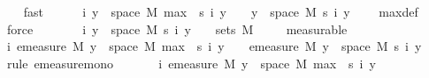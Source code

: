 \begin{isabellebody}
\ {\isacharasterisk}{\kern0pt}\ \isamarkupfalse%
\ fast\isanewline
\ \ \ \ \isamarkupfalse%
\ {\isachardoublequoteopen}{\isasymAnd}i{\isachardot}{\kern0pt}\ {\isacharbraceleft}{\kern0pt}y\ {\isasymin}\ space\ M{\isachardot}{\kern0pt}\ max\ {}\ {\isacharparenleft}{\kern0pt}s\ i\ y{\isacharparenright}{\kern0pt}\ {\isasymnoteq}\ {}{\isacharbraceright}{\kern0pt}\ {\isasymsubseteq}\ {\isacharbraceleft}{\kern0pt}y\ {\isasymin}\ space\ M{\isachardot}{\kern0pt}\ s\ i\ y\ {\isasymnoteq}\ {}{\isacharbraceright}{\kern0pt}{\isachardoublequoteclose}\ \isamarkupfalse%
\ max{\isacharunderscore}{\kern0pt}def\ \isamarkupfalse%
\ force\isanewline
\ \ \ \ \isamarkupfalse%
\ \isamarkupfalse%
\ {\isachardoublequoteopen}{\isasymAnd}i{\isachardot}{\kern0pt}\ {\isacharbraceleft}{\kern0pt}y\ {\isasymin}\ space\ M{\isachardot}{\kern0pt}\ s\ i\ y\ {\isasymnoteq}\ {}{\isacharbraceright}{\kern0pt}\ {\isasymin}\ sets\ M{\isachardoublequoteclose}\ \isamarkupfalse%
\ {\isacharasterisk}{\kern0pt}\ \isamarkupfalse%
\ measurable\isanewline
\ \ \ \ \isamarkupfalse%
\ \isamarkupfalse%
\ {\isachardoublequoteopen}{\isasymAnd}i{\isachardot}{\kern0pt}\ emeasure\ M\ {\isacharbraceleft}{\kern0pt}y\ {\isasymin}\ space\ M{\isachardot}{\kern0pt}\ max\ {}\ {\isacharparenleft}{\kern0pt}s\ i\ y{\isacharparenright}{\kern0pt}\ {\isasymnoteq}\ {}{\isacharbraceright}{\kern0pt}\ {\isasymle}\ emeasure\ M\ {\isacharbraceleft}{\kern0pt}y\ {\isasymin}\ space\ M{\isachardot}{\kern0pt}\ s\ i\ y\ {\isasymnoteq}\ {}{\isacharbraceright}{\kern0pt}{\isachardoublequoteclose}\ \isamarkupfalse%
\ {\isacharparenleft}{\kern0pt}rule\ emeasure{\isacharunderscore}{\kern0pt}mono{\isacharparenright}{\kern0pt}\ \isanewline
\ \ \ \ \isamarkupfalse%
\ {\isacharasterisk}{\kern0pt}{\isacharasterisk}{\kern0pt}{\isacharcolon}{\kern0pt}{\isachardoublequoteopen}{\isasymAnd}i{\isachardot}{\kern0pt}\ emeasure\ M\ {\isacharbraceleft}{\kern0pt}y\ {\isasymin}\ space\ M{\isachardot}{\kern0pt}\ max\ {}\ {\isacharparenleft}{\kern0pt}s\ i\ y{\isacharparenright}{\kern0pt}\ {\isasymnoteq}\ {}{\isacharbraceright}{\kern0pt}\ {\isasymnoteq}\ {\isasyminfinity}{\isachardoublequoteclose}\ \isamarkupfalse%
\ {\isacharasterisk}{\kern0pt}{\isacharparenleft}{\kern0pt}{}{\isacharparenright}{\kern0pt}\ \isamarkupfalse%

\end{isabellebody}
